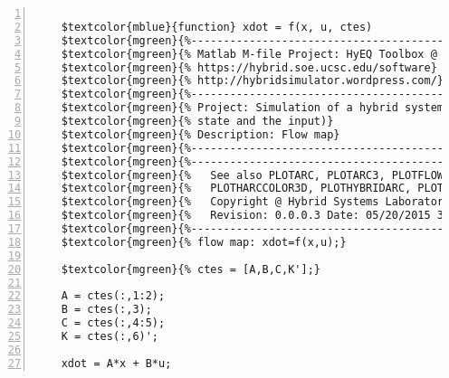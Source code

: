 %  
%  
%  
%  
  
  
\DefineShortVerb[fontfamily=courier,fontseries=m]{\$} 
\DefineShortVerb[fontfamily=courier,fontseries=b]{\#} 
  
\begin{Verbatim}[commandchars=\$\{\},numbers=left,numbersep=2pt] 

    $textcolor{mblue}{function} xdot = f(x, u, ctes) 
    $textcolor{mgreen}{%--------------------------------------------------------------------------} 
    $textcolor{mgreen}{% Matlab M-file Project: HyEQ Toolbox @  Hybrid Systems Laboratory (HSL), } 
    $textcolor{mgreen}{% https://hybrid.soe.ucsc.edu/software} 
    $textcolor{mgreen}{% http://hybridsimulator.wordpress.com/} 
    $textcolor{mgreen}{%--------------------------------------------------------------------------} 
    $textcolor{mgreen}{% Project: Simulation of a hybrid system (plant with constraints in the} 
    $textcolor{mgreen}{% state and the input)} 
    $textcolor{mgreen}{% Description: Flow map} 
    $textcolor{mgreen}{%--------------------------------------------------------------------------} 
    $textcolor{mgreen}{%--------------------------------------------------------------------------} 
    $textcolor{mgreen}{%   See also PLOTARC, PLOTARC3, PLOTFLOWS, PLOTHARC, PLOTHARCCOLOR,} 
    $textcolor{mgreen}{%   PLOTHARCCOLOR3D, PLOTHYBRIDARC, PLOTJUMPS.} 
    $textcolor{mgreen}{%   Copyright @ Hybrid Systems Laboratory (HSL),} 
    $textcolor{mgreen}{%   Revision: 0.0.0.3 Date: 05/20/2015 3:42:00} 
    $textcolor{mgreen}{%--------------------------------------------------------------------------} 
    $textcolor{mgreen}{% flow map: xdot=f(x,u);} 
     
    $textcolor{mgreen}{% ctes = [A,B,C,K'];} 
     
    A = ctes(:,1:2); 
    B = ctes(:,3); 
    C = ctes(:,4:5); 
    K = ctes(:,6)'; 
     
    xdot = A*x + B*u;  
\end{Verbatim}  
  
\UndefineShortVerb{\$} 
\UndefineShortVerb{\#} 
 